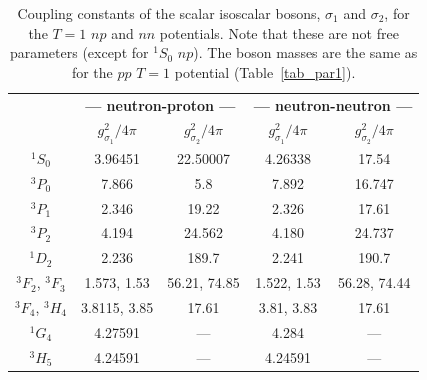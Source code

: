 \begin{table}
\caption{Coupling constants of the scalar isoscalar bosons, $\sigma_1$
and $\sigma_2$, for the $T=1$ $np$ and $nn$ potentials. 
Note that these are not free parameters
(except for $^1S_0$ $np$).
The boson masses are the same as for the $pp$ $T=1$ potential 
(Table~\ref{tab_par1}).}
\begin{tabular}{ccccc}
   
 & \multicolumn{2}{c}{\bf --- neutron-proton ---} 
 & \multicolumn{2}{c}{\bf --- neutron-neutron ---} 
\\
              
 & $g^2_{\sigma_1}/4\pi$
 & $g^2_{\sigma_2}/4\pi$
 & $g^2_{\sigma_1}/4\pi$
 & $g^2_{\sigma_2}/4\pi$
\\
\hline 
$^1S_0$ & 3.96451  & 22.50007
        & 4.26338 & 17.54   \\
$^3P_0$ & 7.866  & 5.8 
        & 7.892 & 16.747  \\
$^3P_1$ & 2.346  & 19.22 
        & 2.326 & 17.61  \\
$^3P_2$ & 4.194  & 24.562 
        & 4.180 & 24.737  \\
$^1D_2$ & 2.236  & 189.7 
        & 2.241 & 190.7  \\
$^3F_2$, $^3F_3$ & 1.573, 1.53  & 56.21, 74.85 
                 & 1.522, 1.53 & 56.28, 74.44  \\
$^3F_4$, $^3H_4$ & 3.8115, 3.85  & 17.61  
                 & 3.81, 3.83  & 17.61   \\
$^1G_4$ & 4.27591 & --- 
        & 4.284  & --- \\
$^3H_5$ & 4.24591 & --- & 4.24591 & --- \\
\end{tabular}
\label{tab_par3}
\end{table}


\pagebreak


